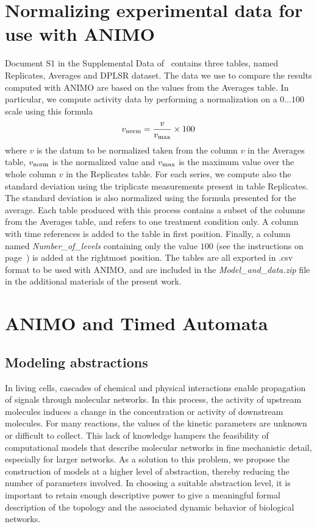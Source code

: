 \documentclass{bmcart}
\begin{document}
\section{Normalizing experimental data for use with ANIMO}\label{suppl-sec:normalization}
Document S1 in the Supplemental Data of~\cite{pathway-autocrine} contains
three tables, named {\sf Replicates}, {\sf Averages} and {\sf DPLSR dataset}.
The data we use to compare the results computed with ANIMO are based on the
values from the {\sf Averages} table.
In particular, we compute activity data by performing a normalization on a $0\dots 100$ scale using this formula
$$
v_{\mbox{\scriptsize norm}} = \frac{v}{v_{\mbox{\scriptsize max}}} \times 100
$$
where $v$ is the datum to be normalized taken from the column $v$ in the {\sf Averages} table,
$v_{\mbox{\scriptsize norm}}$ is the normalized value and
$v_{\mbox{\scriptsize max}}$ is the maximum value over the whole column $v$ in the {\sf Replicates} table.
For each series, we compute also the standard deviation using the triplicate measurements
present in table {\sf Replicates}. The standard deviation is also normalized using the formula presented for the average.
Each table produced with this process contains a subset of the columns from the {\sf Averages} table,
and refers to one treatment condition only. A column with time references is added to the table in first position.
Finally, a column named \emph{Number\_of\_levels} containing only the value $100$ (see the instructions
on page~\pageref{csv-import-format}) is added at the rightmost position.
The tables are all exported in .csv format to be used with ANIMO, and are included in the \emph{Model\_and\_data.zip}
file in the additional materials of the present work.


\clearpage
\section{ANIMO and Timed Automata}\label{suppl-sec:animo-ta}
\subsection{Modeling abstractions}\label{subsec:abstractions}

In living cells, cascades of chemical and physical interactions enable propagation of signals through molecular networks.
In this process, the activity of upstream molecules induces a change in the
concentration or activity of downstream molecules. For many reactions, the values of the kinetic parameters
are unknown or difficult to collect. This lack of knowledge hampers the feasibility
of computational models that describe molecular networks in fine mechanistic detail, especially for larger networks.
As a solution to this problem, we propose the construction of models at a higher level of abstraction,
thereby reducing the number of parameters involved. In choosing a suitable abstraction level, it is important to
retain enough descriptive power to give a meaningful formal description of the topology and the
associated dynamic behavior of biological networks.
\end{document}
